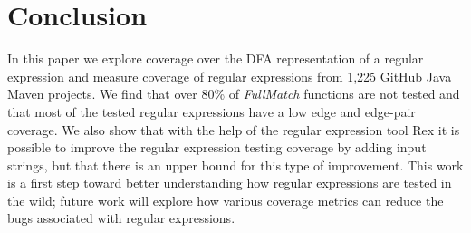\section{Conclusion}
\label{sec:conclusion}
In this paper we explore coverage over the DFA representation of a regular expression and measure  coverage of regular expressions from 1,225 GitHub Java Maven projects. We find that over 80\% of {\em FullMatch} functions are not tested and that most of the tested regular expressions have a low edge and edge-pair coverage. 
We also show that with the help of the regular expression tool Rex it is possible to improve the regular expression testing coverage by adding input strings, but that there is an upper bound for this type of improvement. 
This work is a first step toward better understanding how regular expressions are tested in the wild; future work will explore how various coverage metrics can reduce the bugs associated with regular expressions. %



